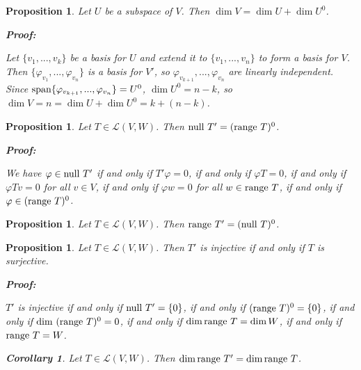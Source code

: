 \documentclass{article}
\theoremstyle{colontheorem}
\newtheorem{proposition}[theorem]{Proposition}
\newtheorem{corollary}{Corollary}[theorem]
\newcommand{\Span}{\textnormal{span}}
\newcommand{\Null}{\textnormal{null }}
\newcommand{\Range}{\textnormal{range }}
\newenvironment{Proposition}
{
	\begin{mdframed}[backgroundcolor=TheoremOrange!10]
	\begin{proposition}
}
{
	\end{proposition}
	\end{mdframed}
	
	\vspace{.15in}
}
\newenvironment{Corollary}
{
	\begin{mdframed}[backgroundcolor=CorollaryBlue!10]
	\begin{corollary}
}
{
	\end{corollary}
	\end{mdframed}
	
	\vspace{.09in}
}
\newenvironment{Proof}
{
	\begin{mdframed}[backgroundcolor=ProofPurple!10]
	\textbf{Proof:}%
}
{
	\end{mdframed}
	
	\vspace{.085in}
}
\begin{document}
\begin{Proposition}
	
	Let $U$ be a subspace of $V$. Then $\dim V = \dim U + \dim U^0$.
	
	\begin{Proof}
		Let $\{v_1, ..., v_k\}$ be a basis for $U$ and extend it to $\{v_1, ..., v_n\}$ to form a basis for $V$. Then $\{\varphi_{v_1}, ..., \varphi_{v_n}\}$ is a basis for $V'$, so $\varphi_{v_{k+1}}, ..., \varphi_{v_n}$ are linearly independent. Since $\Span \{\varphi_{v_{k+1}}, ..., \varphi_{v_n}\} = U^0$, $\dim U^0 = n-k$, so $\dim V = n = \dim U + \dim U^0 = k + (n - k)$.
		
	\end{Proof}
	
\end{Proposition}



\begin{Proposition}
	
	Let $T \in \mathcal{L}(V,W)$. Then $\Null T' = (\Range T)^0$.
	
	\begin{Proof}
		We have $\varphi \in \Null T'$ if and only if $T'\varphi = 0$, if and only if $\varphi T = 0$, if and only if $\varphi Tv = 0$ for all $v \in V$, if and only if $\varphi w = 0$ for all $w \in \Range T$, if and only if $\varphi \in (\Range T)^0$.
		
	\end{Proof}
	
\end{Proposition}



\begin{Proposition}
	
	Let $T \in \mathcal{L}(V,W)$. Then $\Range T' = (\Null T)^0$.
	
\end{Proposition}



\begin{Proposition}
	
	Let $T \in \mathcal{L}(V,W)$. Then $T'$ is injective if and only if $T$ is surjective.
	
	\begin{Proof}
		$T'$ is injective if and only if $\Null T' = \{0\}$, if and only if $(\Range T)^0 = \{0\}$, if and only if $\dim\  (\Range T)^0 = 0$, if and only if $\dim \Range T = \dim W$, if and only if $\Range T = W$.
		
	\end{Proof}
	\vspace{.1in}
	\begin{Corollary}
		
		Let $T \in \mathcal{L}(V,W)$. Then $\dim \Range T' = \dim \Range T$.
		
	\end{Corollary}
	
\end{Proposition}
\end{document}
